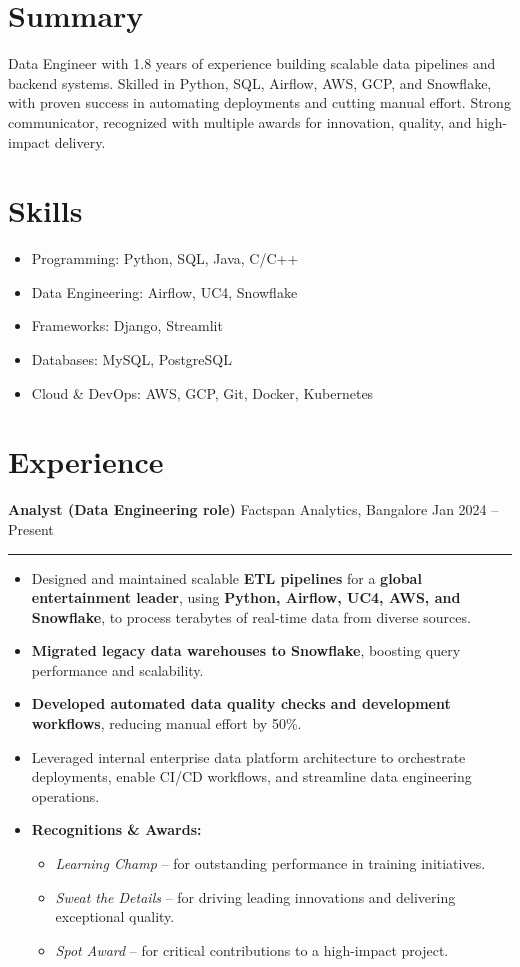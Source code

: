 \documentclass[a4paper,10pt]{article}
\begin{document}

\section*{Summary}
Data Engineer with 1.8 years of experience building scalable data pipelines and backend systems. Skilled in Python, SQL, Airflow, AWS, GCP, and Snowflake, with proven success in automating deployments and cutting manual effort. Strong communicator, recognized with multiple awards for innovation, quality, and high-impact delivery.
\section*{Skills}
\begin{itemize}
    \item Programming: Python, SQL, Java, C/C++
    \item Data Engineering: Airflow, UC4, Snowflake
    \item Frameworks: Django, Streamlit
    \item Databases: MySQL, PostgreSQL
    \item Cloud \& DevOps: AWS, GCP, Git, Docker, Kubernetes
\end{itemize}

\section*{Experience}
\textbf{Analyst (Data Engineering role)} \hfill Factspan Analytics, Bangalore \hfill Jan 2024 – Present\vspace{0.2cm}
\hrule
\vspace{0.2cm}
\begin{itemize}
    \item Designed and maintained scalable \textbf{ETL pipelines} for a \textbf{global entertainment leader}, using \textbf{Python, Airflow, UC4, AWS, and Snowflake}, to process terabytes of real-time data from diverse sources.
    \item \textbf{Migrated legacy data warehouses to Snowflake}, boosting query performance and scalability.
    \item \textbf{Developed automated data quality checks and development workflows}, reducing manual effort by 50\%.
    \item Leveraged internal enterprise data platform architecture to orchestrate deployments, enable CI/CD workflows, and streamline data engineering operations.
    \item \textbf{Recognitions \& Awards:}
    \begin{itemize}
        \item \textit{Learning Champ} – for outstanding performance in training initiatives.
        \item \textit{Sweat the Details} – for driving leading innovations and delivering exceptional quality.
        \item \textit{Spot Award} – for critical contributions to a high-impact project.
    \end{itemize}
\end{itemize}
\end{document}
